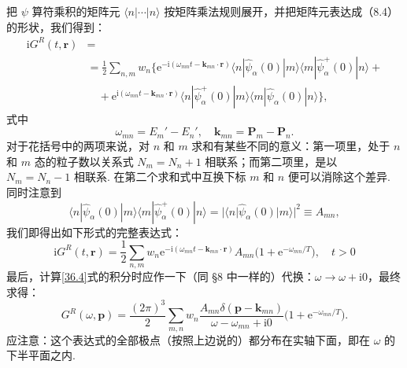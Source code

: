 把 $\psi$ 算符乘积的矩阵元 $\langle n|\cdots|n\rangle$ 按矩阵乘法规则展开，并把矩阵元表达成（8.4）的形状，我们得到：
\begin{equation*}
\begin{aligned}
\mathrm{i}G^{R}(t,\bm r)&={}\\
&=\frac{1}{2}\sum_{n,m}w_n\bigl\{\mathrm{e}^{-\mathrm{i}(\omega_{mn}t-\bm k_{mn}\cdot\bm r)}
\langle n|\hat\psi_\alpha(0)|m\rangle\langle m|\hat\psi^{+}_\alpha(0)|n\rangle+\\
&\quad+\mathrm{e}^{\mathrm{i}(\omega_{mn}t-\bm k_{mn}\cdot\bm r)}
\langle n|\hat\psi^{+}_\alpha(0)|m\rangle\langle m|\hat\psi_\alpha(0)|n\rangle\bigr\},
\end{aligned}
\end{equation*}
式中
\begin{equation*}
\omega_{mn}=E_m'-E_n',\quad\bm k_{mn}=\bm P_m-\bm P_n.
\end{equation*}
对于花括号中的两项来说，对 $n$ 和 $m$ 求和有某些不同的意义：第一项里，处于 $n$ 和 $m$ 态的粒子数以关系式 $N_m=N_n+1$ 相联系；而第二项里，是以 $N_m=N_n-1$ 相联系. 在第二个求和式中互换下标 $m$ 和 $n$ 便可以消除这个差异. 同时注意到
\begin{equation*}
\langle n|\hat\psi_\alpha(0)|m\rangle\langle m|\hat\psi^{+}_\alpha(0)|n\rangle
=|\langle n|\hat\psi_\alpha(0)|m\rangle|^{2}\equiv A_{mn},
\end{equation*}
我们即得出如下形式的完整表达式：
\begin{equation}
\mathrm{i}G^{R}(t,\bm r)=\frac{1}{2}\sum_{n,m}w_n\mathrm{e}^{-\mathrm{i}(\omega_{mn}t-\bm k_{mn}\cdot\bm r)}
A_{mn}\bigl(1+\mathrm{e}^{-\omega_{mn}/T}\bigr),\quad t>0
\label{36.5}
\end{equation}
最后，计算\eqref{36.4}式的积分时应作一下（同 §8 中一样的）代换：$\omega\to\omega+\mathrm{i}0$，最终求得：
\begin{equation}
G^{R}(\omega,\bm p)=\frac{(2\pi)^{3}}{2}\sum_{m,n}w_n
\frac{A_{mn}\delta(\bm p-\bm k_{mn})}{\omega-\omega_{mn}+\mathrm{i}0}
\bigl(1+\mathrm{e}^{-\omega_{mn}/T}\bigr).
\label{36.6}
\end{equation}
应注意：这个表达式的全部极点（按照上边说的）都分布在实轴下面，即在 $\omega$ 的下半平面之内.


